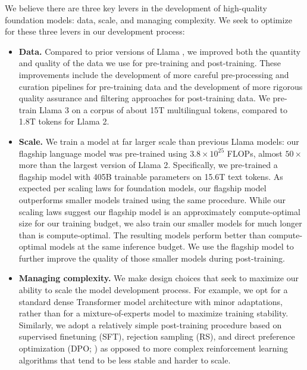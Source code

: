 We believe there are three key levers in the development of high-quality foundation models: data, scale, and managing complexity. We seek to optimize for these three levers in our development process:

\begin{itemize}
\item \textbf{Data.} Compared to prior versions of Llama \citep{touvron2023llama,touvron2023llama2}, we improved both the quantity and quality of the data we use for pre-training and post-training. These improvements include the development of more careful pre-processing and curation pipelines for pre-training data and the development of more rigorous quality assurance and filtering approaches for post-training data. We pre-train Llama 3 on a corpus of about 15T multilingual tokens, compared to 1.8T tokens for Llama 2. 

\item \textbf{Scale.} We train a model at far larger scale than previous Llama models: our flagship language model was pre-trained using $3.8 \times 10^{25}$ FLOPs, almost $50\times$ more than the largest version of Llama 2. Specifically, we pre-trained a flagship model with 405B trainable parameters on 15.6T text tokens. As expected per scaling laws for foundation models, our flagship model outperforms smaller models trained using the same procedure. While our scaling laws suggest our flagship model is an approximately compute-optimal size for our training budget, we also train our smaller models for much longer than is compute-optimal. The resulting models perform better than compute-optimal models at the same inference budget. We use the flagship model to further improve the quality of those smaller models during post-training. 

\item \textbf{Managing complexity.} We make design choices that seek to maximize our ability to scale the model development process. For example, we opt for a standard dense Transformer model architecture \citep{vaswani2017attention} with minor adaptations, rather than for a mixture-of-experts model \citep{shazeer2017moe} to maximize training stability. Similarly, we adopt a relatively simple post-training procedure based on supervised finetuning (SFT), rejection sampling (RS), and direct preference optimization (DPO; \citet{rafailov2023dpo}) as opposed to more complex reinforcement learning algorithms \citep{ouyang2022instructgpt,schulman2017proximal} that tend to be less stable and harder to scale. 
\end{itemize}

